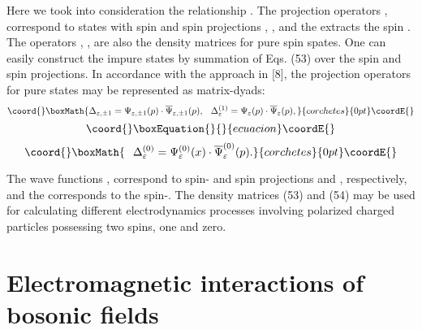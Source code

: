 \documentclass[a4paper,12pt]{article}
\begin{document}
Here we took into consideration the relationship \coordHE{}. The projection operators \coordHE{}, \coordHE{} correspond to
states with spin \coordHE{} and spin projections \coordHE{}, \coordHE{}, and the
\coordHE{} extracts the spin \coordHE{}. The operators
\coordHE{}, \coordHE{},
\coordHE{} are also the density matrices for
pure spin spates. One can easily construct the impure states by
summation of Eqs. (53) over the spin and spin projections. In
accordance with the approach in [8], the projection operators for
pure states may be represented as matrix-dyads:
\[\coord{}\boxMath{
\Delta _{\varepsilon ,\pm 1}=\Psi _{\varepsilon ,\pm 1}(p)\cdot
\overline{\Psi}_{\varepsilon ,\pm 1}(p),\hspace{0.1in}\Delta
_\varepsilon ^{(1)}=\Psi_\varepsilon (p)\cdot \overline{\Psi
}_\varepsilon (p),
}{corchetes}{0pt}\coordE{}\]
\vspace{-8mm}
\begin{equation}\coord{}\boxEquation{
\label{54}
}{
}{ecuacion}\coordE{}\end{equation}
\vspace{-8mm}
\[\coord{}\boxMath{
\hspace{0.1in}\Delta _\varepsilon ^{(0)}=\Psi
_{\varepsilon}^{(0)}(x)\cdot \overline{\Psi} _{\varepsilon
}^{(0)}(p).
}{corchetes}{0pt}\coordE{}\]

The wave functions \coordHE{}, \myHighlight{$\Psi
_\varepsilon $}\coordHE{} correspond to spin-\coordHE{} and spin projections \coordHE{}
and \coordHE{}, respectively, and the \coordHE{}
corresponds to the spin-\coordHE{}. The density matrices (53) and (54)
may be used for calculating different electrodynamics processes
involving polarized charged particles possessing two spins, one
and zero.

\section{Electromagnetic interactions of bosonic fields}
\end{document}
